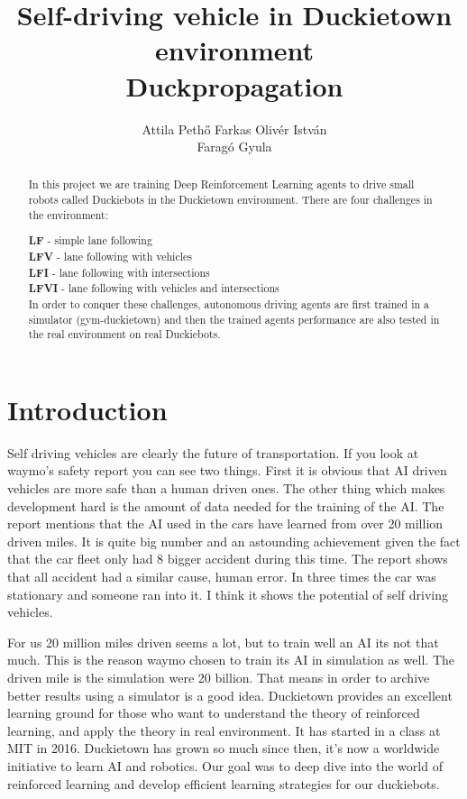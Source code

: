 \documentclass{article}
\title{Self-driving vehicle in Duckietown environment\\
	\large Duckpropagation }
\author{
  Attila Pethő
   \And  
   Farkas Olivér István \\
   \And
    Faragó Gyula\\
}
\begin{document}

\maketitle

\begin{abstract}
  In this project we are training Deep Reinforcement Learning agents to drive small robots called Duckiebots in the Duckietown environment. There are four challenges in the environment:

\textbullet  \textbf{LF} - simple lane following\\
\textbullet \textbf{LFV} - lane following with vehicles\\
\textbullet \textbf{LFI} - lane following with intersections\\
\textbullet \textbf{LFVI} - lane following with vehicles and intersections\\
In order to conquer these challenges, autonomous driving agents are first trained in a simulator (gym-duckietown) and then the trained agents performance are also tested in the real environment on real Duckiebots.
\end{abstract}

\section{\large{Introduction}}

Self driving vehicles are clearly the future of transportation. If you look at waymo's \cite{waymo}  safety report you can see two things. First it is obvious that AI driven vehicles are more safe than a human driven ones. The other thing which makes development hard is the amount of data needed for the training of the AI. 
The report mentions that the AI used in the cars have learned from over 20 million driven miles. It is quite big number and an astounding achievement given the fact that the car fleet only had 8 bigger accident during this time. The report shows that all accident had a similar cause, human error. In three times the car was stationary and someone ran into it. I think it shows the potential of self driving vehicles.

For us 20 million miles driven seems a lot, but to train well an AI its not that much. This is the reason waymo chosen to train its AI in simulation as well. The driven mile is the simulation were 20 billion. That means in order to archive better results using a simulator is a good idea. Duckietown provides an excellent learning ground for those who want to understand the theory of reinforced learning, and apply the theory in real environment. 
It has started in a class at MIT in 2016. Duckietown has grown so much since then, it's now a worldwide initiative to learn AI and robotics. Our goal was to deep dive into the world of reinforced learning and develop efficient learning strategies for our duckiebots. 
\end{document}
